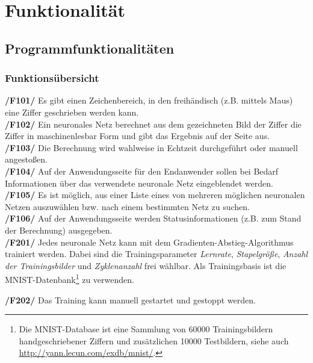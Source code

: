 \section{Funktionalität}

\subsection{Programmfunktionalitäten}
\subsubsection{Funktionsübersicht}

\textbf{/F101/} Es gibt einen Zeichenbereich, in den freihändisch (z.B. mittels Maus) eine Ziffer geschrieben werden kann.\\[-0.2cm]

\textbf{/F102/} Ein neuronales Netz berechnet aus dem gezeichneten Bild der Ziffer die Ziffer in maschinenlesbar Form und gibt das Ergebnis auf der Seite aus. \\[-0.2cm]

\textbf{/F103/} Die Berechnung wird wahlweise in Echtzeit durchgeführt oder manuell angestoßen.\\[-0.2cm]

\textbf{/F104/} Auf der Anwendungsseite für den Endanwender sollen bei Bedarf Informationen über das verwendete neuronale Netz eingeblendet werden.\\[-0.2cm]

\textbf{/F105/} Es ist möglich, aus einer Liste eines von mehreren möglichen neuronalen Netzen auszuwählen bzw. nach einem bestimmten Netz zu suchen. \\[-0.2cm]

\textbf{/F106/} Auf der Anwendungsseite werden Statusinformationen (z.B. zum Stand der Berechnung) ausgegeben. \\[-0.2cm]

\textbf{/F201/} Jedes neuronale Netz kann mit dem Gradienten-Abstieg-Algorithmus trainiert werden. Dabei sind die Trainingsparameter \emph{Lernrate}, \emph{Stapelgröße}, \emph{Anzahl der Trainingsbilder} und \emph{Zyklenanzahl} frei wählbar. Als Trainingsbasis ist die MNIST-Datenbank\footnote{Die MNIST-Database ist eine Sammlung von 60000 Trainingsbildern handgeschriebener Ziffern und zusätzlichen 10000 Testbildern, siehe auch \url{http://yann.lecun.com/exdb/mnist/}.} zu verwenden.

\textbf{/F202/} Das Training kann manuell gestartet und gestoppt werden.\\[-0.2cm]

